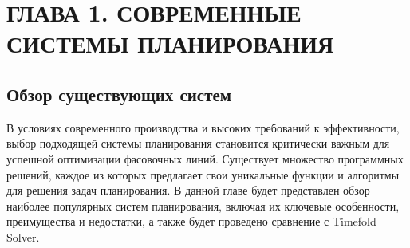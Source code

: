 \chapter{ ГЛАВА 1. СОВРЕМЕННЫЕ СИСТЕМЫ ПЛАНИРОВАНИЯ}
\label{ch:chapter1}

\section{ Обзор существующих систем}
В условиях современного производства и высоких требований к эффективности, выбор подходящей системы планирования становится критически важным для успешной оптимизации фасовочных линий. Существует множество программных решений, каждое из которых предлагает свои уникальные функции и алгоритмы для решения задач планирования. В данной главе будет представлен обзор наиболее популярных систем планирования, включая их ключевые особенности, преимущества и недостатки, а также будет проведено сравнение с Timefold Solver.

